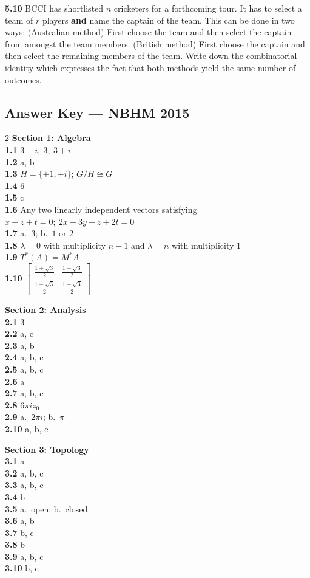 \documentclass[11pt,a4paper]{article}
\newcommand{\examsec}[1]{%
  \subsection*{#1}
  \vspace{-2pt}
}
\newcommand{\qitem}[1]{\par\medskip\noindent\textbf{#1}\hspace{0.5em}}
\begin{document}
\qitem{5.10} BCCI has shortlisted $n$ cricketers for a forthcoming tour. It has to select a team of $r$ players \textbf{and} name the captain of the team. This can be done in two ways: (Australian method) First choose the team and then select the captain from amongst the team members. (British method) First choose the captain and then select the remaining members of the team. Write down the combinatorial identity which expresses the fact that both methods yield the same number of outcomes.

\examsec{Answer Key --- NBHM 2015}
\begin{multicols}{2}
\textbf{Section 1: Algebra}\\
\textbf{1.1} $3 - i,\ 3,\ 3 + i$\\
\textbf{1.2} a, b\\
\textbf{1.3} $H = \{\pm 1, \pm i\}$; $G/H \cong G$\\
\textbf{1.4} $6$\\
\textbf{1.5} c\\
\textbf{1.6} Any two linearly independent vectors satisfying $x - z + t = 0;\ 2x + 3y - z + 2t = 0$\\
\textbf{1.7} a.\ $3$; b.\ $1$ or $2$\\
\textbf{1.8} $\lambda = 0$ with multiplicity $n - 1$ and $\lambda = n$ with multiplicity $1$\\
\textbf{1.9} $T^*(A) = M^* A$\\
\textbf{1.10} $\begin{bmatrix} \frac{1+\sqrt{3}}{2} & \frac{1-\sqrt{3}}{2} \\ \frac{1-\sqrt{3}}{2} & \frac{1+\sqrt{3}}{2} \end{bmatrix}$

\medskip
\textbf{Section 2: Analysis}\\
\textbf{2.1} $3$\\
\textbf{2.2} a, c\\
\textbf{2.3} a, b\\
\textbf{2.4} a, b, c\\
\textbf{2.5} a, b, c\\
\textbf{2.6} a\\
\textbf{2.7} a, b, c\\
\textbf{2.8} $6\pi i z_0$\\
\textbf{2.9} a.\ $2\pi i$; b.\ $\pi$\\
\textbf{2.10} a, b, c

\medskip
\textbf{Section 3: Topology}\\
\textbf{3.1} a\\
\textbf{3.2} a, b, c\\
\textbf{3.3} a, b, c\\
\textbf{3.4} b\\
\textbf{3.5} a.\ open; b.\ closed\\
\textbf{3.6} a, b\\
\textbf{3.7} b, c\\
\textbf{3.8} b\\
\textbf{3.9} a, b, c\\
\textbf{3.10} b, c


\end{multicols}
\end{document}
